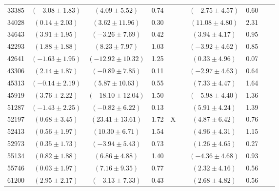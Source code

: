 \documentclass [10pt, twoside] {uwthesis}[2012/04/02]
\begin{document}
{\begin{longtable}[t]{|c|c|cccc|cccc|}
33385	&  $(	-3.08	  \pm  	1.83	)$  &  $(	4.09	  \pm  	5.52	)$  &  	0.74	  &  		  &  		  &  $(	-2.75	  \pm  	4.57	)$  &  	0.60	  &  		  &  		  \\
34028	&  $(	0.14	  \pm  	2.03	)$  &  $(	3.62	  \pm  	11.96	)$  &  	0.30	  &  		  &  		  &  $(	11.08	  \pm  	4.80	)$  &  	2.31	  &  		  &  		  \\
34643	&  $(	3.91	  \pm  	1.95	)$  &  $(	-3.26	  \pm  	7.69	)$  &  	0.42	  &  		  &  		  &  $(	3.94	  \pm  	4.17	)$  &  	0.95	  &  		  &  		  \\
42293	&  $(	1.88	  \pm  	1.88	)$  &  $(	8.23	  \pm  	7.97	)$  &  	1.03	  &  		  &  		  &  $(	-3.92	  \pm  	4.62	)$  &  	0.85	  &  		  &  		  \\
42641	&  $(	-1.63	  \pm  	1.95	)$  &  $(	-12.92	  \pm  	10.32	)$  &  	1.25	  &  		  &  		  &  $(	0.33	  \pm  	4.96	)$  &  	0.07	  &  		  &  		  \\
43306	&  $(	2.14	  \pm  	1.87	)$  &  $(	-0.89	  \pm  	7.85	)$  &  	0.11	  &  		  &  		  &  $(	-2.97	  \pm  	4.63	)$  &  	0.64	  &  		  &  		  \\
45313	&  $(	-0.14	  \pm  	2.19	)$  &  $(	5.87	  \pm  	10.63	)$  &  	0.55	  &  		  &  		  &  $(	7.33	  \pm  	4.47	)$  &  	1.64	  &  		  &  		  \\
45919	&  $(	3.76	  \pm  	2.22	)$  &  $(	-18.10	  \pm  	12.04	)$  &  	1.50	  &  		  &  		  &  $(	-5.98	  \pm  	4.40	)$  &  	1.36	  &  		  &  		  \\
51287	&  $(	-1.43	  \pm  	2.25	)$  &  $(	-0.82	  \pm  	6.22	)$  &  	0.13	  &  		  &  		  &  $(	5.91	  \pm  	4.24	)$  &  	1.39	  &  		  &  		  \\
52197	&  $(	0.68	  \pm  	3.45	)$  &  $(	23.41	  \pm  	13.61	)$  &  	1.72	  &  	X	  &  		  &  $(	4.87	  \pm  	6.42	)$  &  	0.76	  &  		  &  		  \\
52413	&  $(	0.56	  \pm  	1.97	)$  &  $(	10.30	  \pm  	6.71	)$  &  	1.54	  &  		  &  		  &  $(	4.96	  \pm  	4.31	)$  &  	1.15	  &  		  &  		  \\
52973	&  $(	0.35	  \pm  	1.73	)$  &  $(	-3.94	  \pm  	5.43	)$  &  	0.73	  &  		  &  		  &  $(	1.26	  \pm  	4.65	)$  &  	0.27	  &  		  &  		  \\
55134	&  $(	0.82	  \pm  	1.88	)$  &  $(	6.86	  \pm  	4.88	)$  &  	1.40	  &  		  &  		  &  $(	-4.36	  \pm  	4.68	)$  &  	0.93	  &  		  &  		  \\
55746	&  $(	0.03	  \pm  	1.97	)$  &  $(	7.16	  \pm  	9.35	)$  &  	0.77	  &  		  &  		  &  $(	2.32	  \pm  	4.16	)$  &  	0.56	  &  		  &  		  \\
61200	&  $(	2.95	  \pm  	2.17	)$  &  $(	-3.13	  \pm  	7.33	)$  &  	0.43	  &  		  &  		  &  $(	2.68	  \pm  	4.82	)$  &  	0.56	  &  		  &  		  \\ \hline

\end{longtable}}
\end{document}
